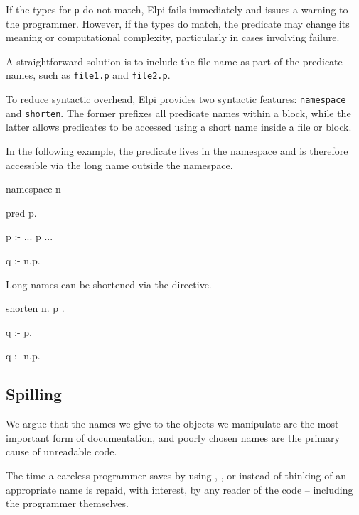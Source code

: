 \documentclass[a4paper, 11pt]{book}
\begin{document}
If the types for \texttt{p} do not match, Elpi fails immediately and issues a
warning to the programmer. However, if the types do match, the predicate may
change its meaning or computational complexity, particularly in cases involving
failure.

A straightforward solution is to include the file name as part of the predicate
names, such as \texttt{file1.p} and \texttt{file2.p}.

To reduce syntactic overhead, Elpi provides two syntactic features:
\texttt{namespace} and \texttt{shorten}. The former prefixes all predicate
names within a block, while the latter allows predicates to be accessed using a
short name inside a file or block.

In the following example, the predicate  lives in the namespace
 and is therefore accessible via the long name  outside the
namespace.

\begin{elpicode}
namespace n {

  pred p.

  p :- ... p ...

}

q :- n.p.
\end{elpicode}

\noindent
Long names can be shortened via the  directive.

\begin{elpicode}
shorten n.{ p }.

q :- p.

q :- n.p.
\end{elpicode}

\subsection{Spilling}\label{sec:spilling}


We argue that the names we give to the objects we manipulate are the most
important form of documentation, and poorly chosen names are the primary cause
of unreadable code.

The time a careless programmer saves by using , , or
 instead of thinking of an appropriate name is repaid, with
interest, by any reader of the code -- including the programmer themselves.
\end{document}
